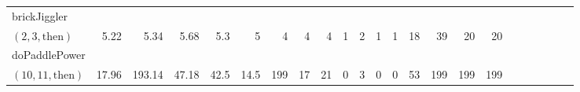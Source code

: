 \documentclass[sigconf]{acmart}
\newcommand{\thenBr}{\text{then}}
\newcommand{\elseBr}{\text{else}}
\newcommand{\inFor}{\text{inFor}}
\begin{document}
\begin{table*}
{\begin{tabular}{l|rrrr|rrrr|rrrr|rrrr|r|r|r|r|r|r}
    \midrule
    \midrule
    brickJiggler      &             &             &                &               &       &       &         &         &          &          &            &             &          &         &            & & & & & & &\\
    $(2,3,\thenBr)$   & 5.22        & 5.34        & 5.68           & 5.3           & 5     & 4     & 4       & 4       & 1        & 2        & 1          & 1           & 18       & 39      & 20         & 20 & & & & & & \\
    doPaddlePower     &             &             &                &               &       &       &         &         &          &          &            &             &          &         &            & & & & & & & \\
    $(10,11,\thenBr)$ & 17.96       & 193.14      & 47.18          & 42.5          & 14.5  & 199   & 17      & 21      & 0        & 3        & 0          & 0           & 53       & 199     & 199        & 199 & & & & & & \\

\end{tabular}}
\end{table*}
\end{document}
